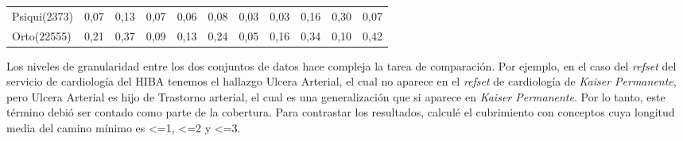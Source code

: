 \begin{table}[htb]
{\begin{tabular}{@{}lllllllllll@{}}
Psiqui(2373)                                         & 0,07                  & 0,13                 & 0,07                  & 0,06               & 0,08                 & 0,03                   & 0,03                & 0,16                 & 0,30                   & 0,07                \\
Orto(22555)                                          & 0,21                  & 0,37                 & 0,09                  & 0,13               & 0,24                 & 0,05                   & 0,16                & 0,34                 & 0,10                   & 0,42                \\ \bottomrule
\end{tabular}%
}
\end{table}

Los niveles de granularidad entre los dos conjuntos de datos hace compleja la tarea de comparación. Por ejemplo, en el caso del \textit{\acrshort{refset}} del servicio de cardiología del \acrshort{HIBA} tenemos el hallazgo Ulcera Arterial, el cual no aparece en el \textit{\acrshort{refset}}  de cardiología de \textit{Kaiser Permanente}, pero Ulcera Arterial es hijo de Trastorno arterial, el cual es una generalización que si aparece en \textit{Kaiser Permanente}. Por lo tanto, este término debió ser contado como parte de la cobertura. Para contrastar los resultados, calculé el cubrimiento con conceptos cuya longitud media del camino mínimo es \textless=1, \textless=2 y \textless=3. 


